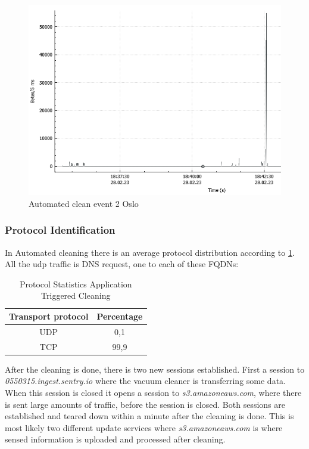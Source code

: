 \begin{figure}[H]
    \centering
    \includegraphics[width=\textwidth]{figures/TC-graph.png}
    \caption{Automated clean event 2 Oslo}
    \label{fig:Tc-graph}
\end{figure}

\subsubsection{Protocol Identification}
In Automated cleaning there is an average protocol distribution according to \ref{tab:tcanalysisdist}. All the udp traffic is DNS request, one to each of these FQDNs:

\begin{table}[H]
\centering
\caption{Protocol Statistics Application Triggered Cleaning}
\label{tab:tcanalysisdist}
\begin{tabular}{|c|c|}
\hline
\textbf{Transport protocol} & \textbf{Percentage} \\ \hline
UDP                         & 0,1                 \\ \hline
TCP                         & 99,9                \\ \hline
\end{tabular}
\end{table}



After the cleaning is done, there is two new sessions established. First a session to \textit{0550315.ingest.sentry.io} where the vacuum cleaner is transferring some data. When this session is closed it opens a session to \textit{s3.amazoneaws.com}, where there is sent large amounts of traffic, before the session is closed. Both sessions are established and teared down within a minute after the cleaning is done. This is most likely two different update services where \textit{s3.amazoneaws.com} is where sensed information is uploaded and processed after cleaning.

